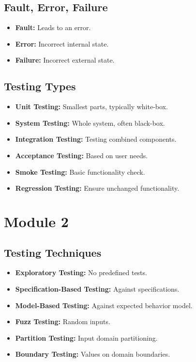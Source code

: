 \documentclass[10pt,portrait]{article}
\begin{document}
\begin{multicols}{ 3 }
\subsection*{Fault, Error, Failure}
\begin{itemize}
    \item \textbf{Fault:} Leads to an error.
    \item \textbf{Error:} Incorrect internal state.
    \item \textbf{Failure:} Incorrect external state.
\end{itemize}

\subsection*{Testing Types}
\begin{itemize}
    \item \textbf{Unit Testing:} Smallest parts, typically white-box.
    \item \textbf{System Testing:} Whole system, often black-box.
    \item \textbf{Integration Testing:} Testing combined components.
    \item \textbf{Acceptance Testing:} Based on user needs.
    \item \textbf{Smoke Testing:} Basic functionality check.
    \item \textbf{Regression Testing:} Ensure unchanged functionality.
\end{itemize}

\section*{Module 2}
\subsection*{Testing Techniques}
\begin{itemize}
    \item \textbf{Exploratory Testing:} No predefined tests.
    \item \textbf{Specification-Based Testing:} Against specifications.
    \item \textbf{Model-Based Testing:} Against expected behavior model.
    \item \textbf{Fuzz Testing:} Random inputs.
    \item \textbf{Partition Testing:} Input domain partitioning.
    \item \textbf{Boundary Testing:} Values on domain boundaries.
\end{itemize}


\end{multicols}
\end{document}
